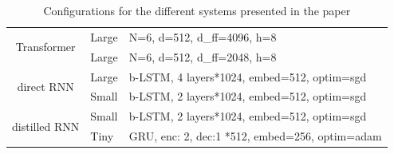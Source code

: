 \documentclass[11pt,a4paper]{article}
\begin{document}


\begin{table}[]
\centering\small
\begin{tabular}{cll}
\hline
\multirow{2}{*}{Transformer}   & Large          & N=6, d=512, d\_ff=4096, h=8                    \\ \cline{2-3}
                               & Large         & N=6, d=512, d\_ff=2048, h=8                    \\ \hline
\multirow{2}{*}{direct RNN}     & Large & b-LSTM, 4 layers*1024, embed=512, optim=sgd    \\ \cline{2-3}
                               & Small & b-LSTM, 2 layers*1024, embed=512, optim=sgd    \\ \hline
\multirow{2}{*}{distilled RNN} & Small          & b-LSTM, 2 layers*1024, embed=512, optim=sgd    \\ \cline{2-3}
                               & Tiny           & GRU, enc: 2, dec:1 *512, embed=256, optim=adam \\ \hline
\end{tabular}
\caption{\small Configurations for the different systems presented in the paper}
\label{table:config}
\end{table}
\end{document}
